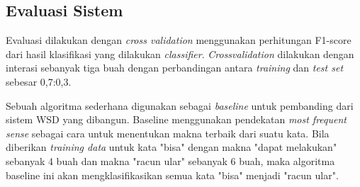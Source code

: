 \subsection{Evaluasi Sistem}
Evaluasi dilakukan dengan \textit{cross validation} menggunakan perhitungan F1-score dari hasil klasifikasi yang dilakukan \textit{classifier}. \textit{Crossvalidation} dilakukan dengan interasi sebanyak tiga buah dengan perbandingan antara \textit{training} dan \textit{test set} sebesar 0,7:0,3.

Sebuah algoritma sederhana digunakan sebagai \textit{baseline} untuk pembanding dari sistem WSD yang dibangun. Baseline menggunakan pendekatan \textit{most frequent sense} sebagai cara untuk menentukan makna terbaik dari suatu kata. Bila diberikan \textit{training data} untuk kata "bisa" dengan makna "dapat melakukan" sebanyak 4 buah dan makna "racun ular" sebanyak 6 buah, maka algoritma baseline ini akan mengklasifikasikan semua kata "bisa" menjadi "racun ular".

